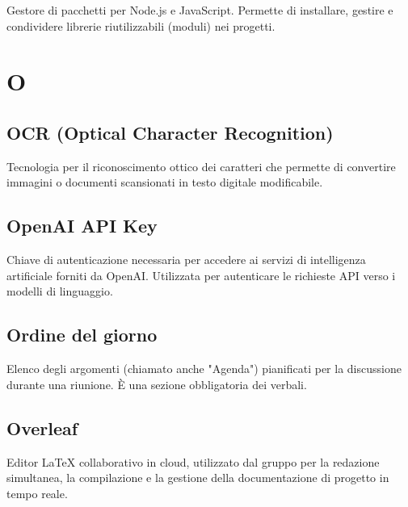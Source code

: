 \documentclass[a4paper, 11pt, oneside]{scrartcl} %
\begin{document}

Gestore di pacchetti per Node.js e JavaScript. Permette di installare, gestire e condividere librerie riutilizzabili (moduli) nei progetti.

\vspace{0.5cm}



\section*{O}


\subsection*{OCR (Optical Character Recognition)}
Tecnologia per il riconoscimento ottico dei caratteri che permette di convertire immagini o documenti scansionati in testo digitale modificabile.
\vspace{0.5cm}

\subsection*{OpenAI API Key}


Chiave di autenticazione necessaria per accedere ai servizi di intelligenza artificiale forniti da OpenAI. Utilizzata per autenticare le richieste API verso i modelli di linguaggio.

\vspace{0.5cm}

\subsection*{Ordine del giorno}


Elenco degli argomenti (chiamato anche "Agenda") pianificati per la discussione durante una riunione. È una sezione obbligatoria dei verbali.

\vspace{0.5cm}

\subsection*{Overleaf}
Editor LaTeX collaborativo in cloud, utilizzato dal gruppo per la redazione simultanea, la compilazione e la gestione della documentazione di progetto in tempo reale.
\vspace{0.5cm}
\end{document}
